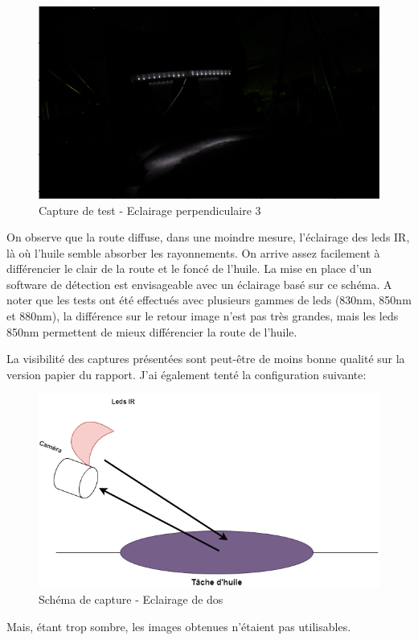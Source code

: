 \begin{figure}[H]
    \centering
    \includegraphics[width=13cm]{assets/figures/eclairage_perpendiculaire3.png}
    \caption{Capture de test - Eclairage perpendiculaire 3}
\end{figure}
\newpage
On observe que la route diffuse, dans une moindre mesure, l'éclairage des leds IR, là où l'huile semble absorber les rayonnements. On arrive
assez facilement à différencier le clair de la route et le foncé de l'huile. La mise en place d'un software de détection est envisageable avec
un éclairage basé sur ce schéma. A noter que les tests ont été effectués avec plusieurs gammes de leds (830nm, 850nm et 880nm), la différence
sur le retour image n'est pas très grandes, mais les leds 850nm permettent de mieux différencier la route de l'huile.

La visibilité des captures présentées sont peut-être de moins bonne qualité sur la version papier du rapport.
J'ai également tenté la configuration suivante:
\begin{figure}[H]
    \centering
    \includegraphics[width=13cm]{assets/figures/eclairage_dos.png}
    \caption{Schéma de capture - Eclairage de dos}
\end{figure}
Mais, étant trop sombre, les images obtenues n'étaient pas utilisables.
\newpage
